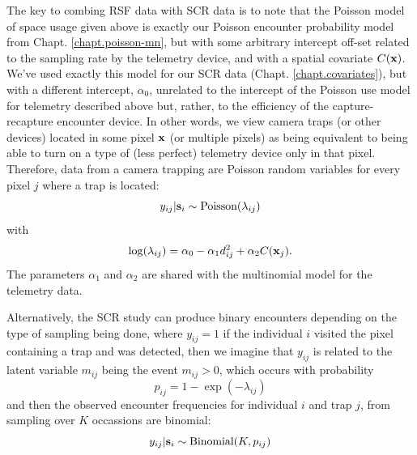 The key to combing RSF data with SCR data is 
to note that the Poisson model of space usage given above is 
exactly our Poisson encounter probability model from
Chapt. \ref{chapt.poisson-mn}, but with some arbitrary intercept off-set
related to the 
sampling rate by the telemetry device, and with
a spatial covariate  $C({\bf x})$.
We've used exactly this model for our SCR data (Chapt. \ref{chapt.covariates}), but with a different intercept,
$\alpha_{0}$, unrelated to the intercept of the Poisson use model
for telemetry described above but, rather, to the efficiency of the capture-recapture
encounter device. 
In other words, we view camera traps (or other devices) located in
some pixel ${\bf x}$ (or multiple pixels) as being equivalent to being able to turn on a
type of (less perfect) telemetry device only in that pixel.
Therefore, 
data from a camera trapping are Poisson random variables 
for every pixel $j$ where a trap is located:
\[
y_{ij}|{\bf s}_{i} \sim \mbox{Poisson}( \lambda_{ij})
\]
with 
\[
 \log(\lambda_{ij}) =  \alpha_{0} -\alpha_{1}
 d_{ij}^{2} +  \alpha_{2} C({\bf x}_{j}).
\]
The parameters $\alpha_{1}$ and $\alpha_{2}$ are shared with the
multinomial model for the telemetry data.

Alternatively, 
the SCR study can produce binary 
encounters depending on the type of sampling being done,
where $y_{ij} = 1$ if the individual $i$ visited
the pixel containing a trap and was detected, then we imagine that
$y_{ij}$ is related to the latent variable $m_{ij}$ being the event
$m_{ij}>0$, which occurs with probability
\begin{equation}
 p_{ij} = 1-\exp(- \lambda_{ij})
\label{rsf.eq.cloglog}
\end{equation}
and then the observed encounter frequencies for individual $i$ and trap $j$, from
sampling over $K$ occassions are binomial:
\[
 y_{ij}|{\bf s}_{i} \sim \mbox{Binomial}(K, p_{ij}) 
\]


